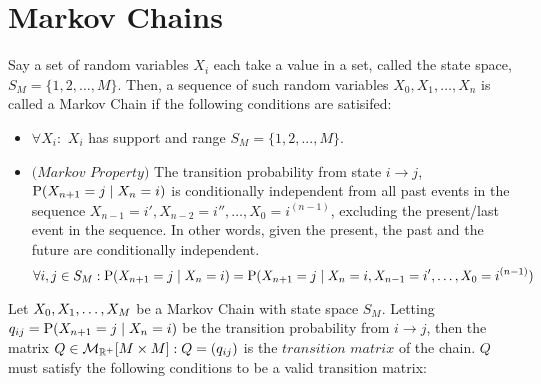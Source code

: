 

\newpage
\section{Markov Chains}



\begin{definition} Say a set of random variables $X_i$ each take a value in a set, called the state space, $S_M = \{1,2,\dots,M\}$. Then, a sequence of such random variables $X_0,X_1,\dots,X_n$ is called a Markov Chain if the following conditions are satisifed:
\end{definition}

\begin{itemize}
\item $\forall X_i:$ $X_i$ has support and range $S_M = \{1,2,...,M\}$.
\item $\textit{(Markov Property)}$ The transition probability from state $i \to j$, $\Prb(X_{n+1} = j \mid X_n = i)$ is conditionally independent from all past events in the sequence $X_{n-1} = i',X_{n-2} = i'', \dots,X_0 = i^{(n-1)}$, excluding the present/last event in the sequence. In other words, given the present, the past and the future are conditionally independent.
$$\forall i,j \in S_M: \Prb(X_{n+1} = j \mid X_n = i) = \Prb(X_{n+1} = j \mid X_n = i, X_{n-1} = i', \dots,X_0 = i^{(n-1)})$$
\end{itemize}

\begin{definition}  Let $\seq[M]{X}$ be a Markov Chain with state space $S_M$. Letting $q_{ij} = \Prb(X_{n+1} = j \mid X_n = i)$ be the transition probability from $i \to j$, then the matrix $Q \in \mathcal{M}_{\R^+}[M\times M]: Q=(q_{ij})$ is the $\textit{transition matrix}$ of the chain. $Q$ must satisfy the following conditions to be a valid transition matrix:
\end{definition}


